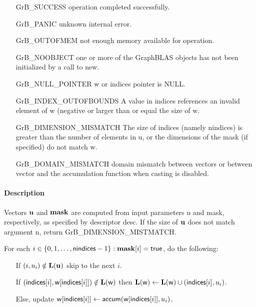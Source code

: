 \begin{itemize}[leftmargin=2.1in]
\item[{\sf GrB\_SUCCESS}]      operation completed successfully.
\item[{\sf GrB\_PANIC}]        unknown internal error.
\item[{\sf GrB\_OUTOFMEM}]     not enough memory available for operation.
\item[{\sf GrB\_NOOBJECT}]          one or more of the GraphBLAS objects has
                                    not been initialized by a call to {\sf new}.
\item[{\sf GrB\_NULL\_POINTER}]    {\sf w} or {\sf indices} pointer is {\sf NULL}.

\item[{\sf GrB\_INDEX\_OUTOFBOUNDS}]
        A value in {\sf indices} references an invalid element of {\sf w} (negative or larger than or equal the size of {\sf w}.
\item[{\sf GrB\_DIMENSION\_MISMATCH}] 
        The size of {\sf indices} (namely {\sf nindices}) is greater than the number of elements in {\sf u}, or
        the dimensions of the mask (if specified) do not match {\sf w}.
\item[\sf GrB\_DOMAIN\_MISMATCH]  
       domain mismatch between vectors or between vector and the accumulation function when casting is disabled.
\end{itemize}

\paragraph{Description}

Vectors ${\bf u}$ and ${\bf mask}$ are computed from input parameters {\sf u} and {\sf mask}, respectively, as specified by descriptor {\sf desc}. If
the size of ${\bf u}$ does not match argument {\sf n}, return {\sf GrB\_DIMENSION\_MISTMATCH}.

For each $i \in \{0, 1, \ldots, {\sf nindices}-1 \} : {\bf mask}[i] = {\sf true}$, do the following:
\begin{itemize}
	\item[] If $(i, u_i) \notin \bold{L}({\bf u})$ skip to the next $i$.
	\item[] If $({\sf indices}[i], {\sf w}[{\sf indices}[i]]) \notin \bold{L}({\sf w})$ then
	      $\bold{L}({\sf w}) \leftarrow \bold{L}({\sf w}) \cup ({\sf indices}[i],u_i)$.
	\item[] Else, update ${\sf w}[{\sf indices}[i]] \leftarrow {\sf accum}({\sf w}[{\sf indices}[i]],u_i)$.
\end{itemize}


